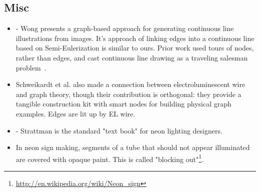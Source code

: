 \subsection{Misc}
\begin{itemize}
\item \cite{Wong-cgf11} - Wong presents a graph-based approach for generating continuous line illustrations from images. It's approach of linking edges into a continuous line based on Semi-Eulerization is similar to ours. Prior work used tours of nodes, rather than edges, and cast continuous line drawing as a traveling salesman problem~\cite{Bosch-tsp}.
\item \cite{Schweikardt-tei09} Schweikardt et al. also made a connection between electroluminescent wire and graph theory, though their contribution is orthogonal: they provide a tangible construction kit with smart nodes for building physical graph examples. Edges are lit up by EL wire.
\item \cite{strattman1997neon} - Strattman is the standard "text book" for neon lighting designers.
\item In neon sign making, segments of a tube that should not appear illuminated are covered with opaque paint. This is called "blocking out"\footnote{\url{http://en.wikipedia.org/wiki/Neon_sign}}.
\end{itemize}